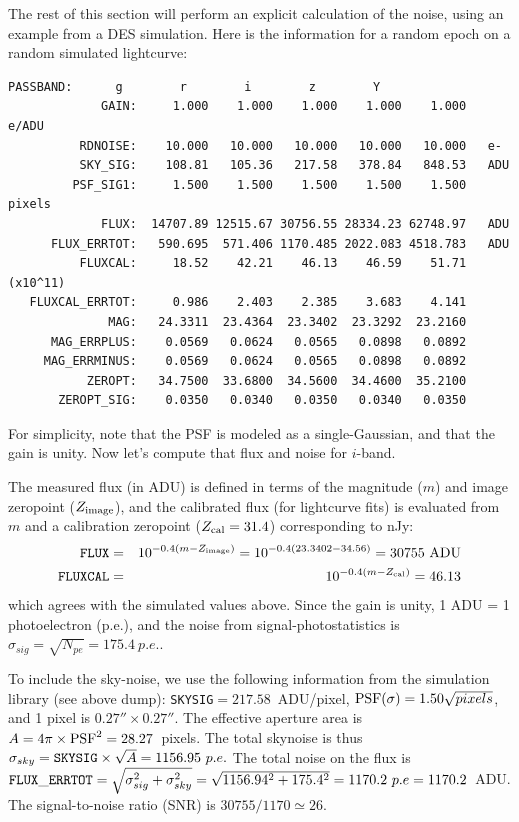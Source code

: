 \documentclass[12pt]{article}
\begin{document}
{\bigskip
The rest of this section will perform an explicit calculation
of the noise, using an example from a DES simulation.
Here is the information for a random epoch on a random
simulated lightcurve:

\clearpage
\begin{Verbatim}[frame=single]
        PASSBAND:      g        r        i        z        Y   
             GAIN:     1.000    1.000    1.000    1.000    1.000   e/ADU 
          RDNOISE:    10.000   10.000   10.000   10.000   10.000   e- 
          SKY_SIG:    108.81   105.36   217.58   378.84   848.53   ADU 
         PSF_SIG1:     1.500    1.500    1.500    1.500    1.500   pixels 
             FLUX:  14707.89 12515.67 30756.55 28334.23 62748.97   ADU 
      FLUX_ERRTOT:   590.695  571.406 1170.485 2022.083 4518.783   ADU  
          FLUXCAL:     18.52    42.21    46.13    46.59    51.71   (x10^11) 
   FLUXCAL_ERRTOT:     0.986    2.403    2.385    3.683    4.141     
              MAG:   24.3311  23.4364  23.3402  23.3292  23.2160     
      MAG_ERRPLUS:    0.0569   0.0624   0.0565   0.0898   0.0892     
     MAG_ERRMINUS:    0.0569   0.0624   0.0565   0.0898   0.0892     
           ZEROPT:   34.7500  33.6800  34.5600  34.4600  35.2100 
       ZEROPT_SIG:    0.0350   0.0340   0.0350   0.0340   0.0350 
\end{Verbatim}
%
For simplicity, note that the PSF is modeled as a single-Gaussian,
and that the gain is unity.  Now let's compute that flux and noise
for $i$-band.

\newcommand{\Zcal}{Z_{\rm cal}}
\newcommand{\Zimg}{Z_{\rm image}}

The measured flux (in ADU) is defined in terms of the magnitude ($m$) 
and image zeropoint ($\Zimg$), and 
the calibrated flux (for lightcurve fits) is evaluated from $m$ and
a calibration zeropoint ($\Zcal=31.4$) corresponding to nJy:
%
\begin{eqnarray}
   {\tt FLUX}    & = & 10^{-0.4(m - \Zimg)}  =  10^{-0.4(23.3402 - 34.56)} 
        = 30755~{\rm ADU} \\
   {\tt FLUXCAL} & = & 10^{-0.4(m - \Zcal)}  =  46.13
\end{eqnarray}
%
which agrees with the simulated values above.
Since the gain is unity, 1 ADU = 1 photoelectron (p.e.),
and the noise from signal-photostatistics is
$\sigma_{sig} = \sqrt{N_{pe}} = 175.4~p.e.$.

To include the sky-noise, we use the following information from the
simulation library (see above dump): 
{\tt SKYSIG}$= 217.58$~ADU/pixel, ${\rm PSF}(\sigma) = 1.50 \sqrt{pixels}$, 
and 1 pixel is $0.27'' \times 0.27''$.
The effective aperture area is $A=4\pi \times {\rm PSF}^2 = 28.27$~pixels.
The total skynoise is thus 
$\sigma_{sky} = {\tt SKYSIG} \times \sqrt{A} = 1156.95~p.e.$
The total noise on the flux is
${\tt FLUX\_ERRTOT} = \sqrt{\sigma_{sig}^2 + \sigma_{sky}^2}
  = \sqrt{1156.94^2 + 175.4^2} = 1170.2~p.e = 1170.2$~ADU.
The signal-to-noise ratio (SNR) is 
$30755/1170 \simeq 26$.

}
\end{document}
